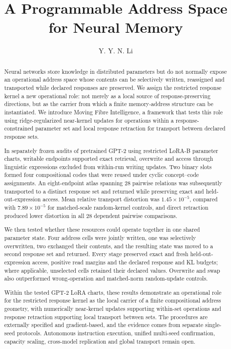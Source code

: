 \documentclass[11pt]{article}
\title{\bfseries A Programmable Address Space for Neural Memory}
\author{Y. Y. N. Li}
\date{}
\begin{document}
\maketitle
\thispagestyle{fancy}
\vspace{-1.2em}

\begin{abstract}
\noindent
Neural networks store knowledge in distributed parameters but do not normally expose an operational address
space whose contents can be selectively written, reassigned and transported while declared responses are
preserved. We assign the restricted response kernel a new operational role: not merely as a local source of
response-preserving directions, but as the carrier from which a finite memory-address structure can be
instantiated. We introduce Moving Fibre Intelligence, a framework that tests this role using ridge-regularized
near-kernel updates for operations within a response-constrained parameter set and local response retraction
for transport between declared response sets.

In separately frozen audits of pretrained GPT-2 using restricted LoRA-B parameter charts, writable endpoints
supported exact retrieval, overwrite and access through linguistic expressions excluded from within-run
writing updates. Two binary slots formed four compositional codes that were reused under cyclic
concept--code assignments. An eight-endpoint atlas spanning 28 pairwise relations was subsequently transported
to a distinct response set and returned while preserving exact and held-out-expression access. Mean relative
transport distortion was $1.45\times10^{-5}$, compared with $7.89\times10^{-5}$ for matched-scale
random-kernel controls, and direct retraction produced lower distortion in all 28 dependent pairwise
comparisons.

We then tested whether these resources could operate together in one shared parameter state. Four address
cells were jointly written, one was selectively overwritten, two exchanged their contents, and the resulting
state was moved to a second response set and returned. Every stage preserved exact and fresh
held-out-expression access, positive read margins and the declared response and KL budgets; where applicable,
unselected cells retained their declared values. Overwrite and swap also outperformed wrong-operation and
matched-norm random-update controls.

Within the tested GPT-2 LoRA charts, these results demonstrate an operational role for the restricted response
kernel as the local carrier of a finite compositional address geometry, with numerically near-kernel updates
supporting within-set operations and response retraction supporting local transport between sets. The procedures are externally
specified and gradient-based, and the evidence comes from separate single-seed protocols. Autonomous
instruction execution, unified multi-seed confirmation, capacity scaling, cross-model replication and global
transport remain open.
\end{abstract}
\end{document}
